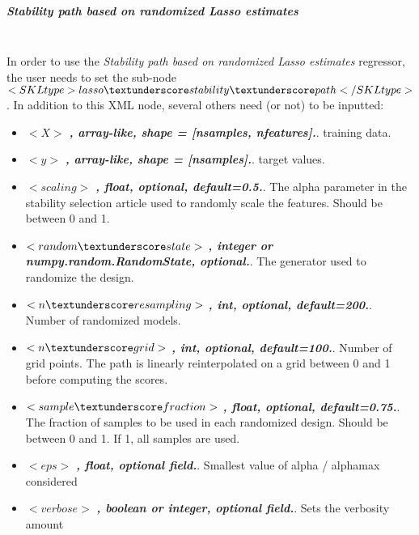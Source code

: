\subparagraph{Stability path based on randomized Lasso estimates}
\mbox{}
\\In order to use the \textit{Stability path based on randomized Lasso estimates} regressor, the user needs to set the sub-node $<SKLtype>lasso\textunderscore stability\textunderscore path</SKLtype>$.
In addition to this XML node, several others need (or not) to be inputted:
\begin{itemize}
  \item $<X>$ \textbf{\textit{, array-like, shape = [n\textunderscore samples, n\textunderscore features].}}. training data.
  \item $<y>$ \textbf{\textit{, array-like, shape = [n\textunderscore samples].}}. target values.
  \item $<scaling>$ \textbf{\textit{, float, optional, default=0.5.}}. The alpha parameter in the stability selection article used to randomly scale the features. Should be between 0 and 1.
  \item $<random\textunderscore state>$ \textbf{\textit{, integer or numpy.random.RandomState, optional.}}. The generator used to randomize the design.
  \item $<n\textunderscore resampling>$ \textbf{\textit{, int, optional, default=200.}}. Number of randomized models.
  \item $<n\textunderscore grid>$ \textbf{\textit{, int, optional, default=100.}}. Number of grid points. The path is linearly reinterpolated on a grid between 0 and 1 before computing the scores.
  \item $<sample\textunderscore fraction>$ \textbf{\textit{, float, optional, default=0.75.}}. The fraction of samples to be used in each randomized design. Should be between 0 and 1. If 1, all samples are used.
  \item $<eps>$ \textbf{\textit{, float, optional field.}}. Smallest value of alpha / alpha\textunderscore max considered
  \item $<verbose>$ \textbf{\textit{, boolean or integer, optional field.}}. Sets the verbosity amount
\end{itemize}


